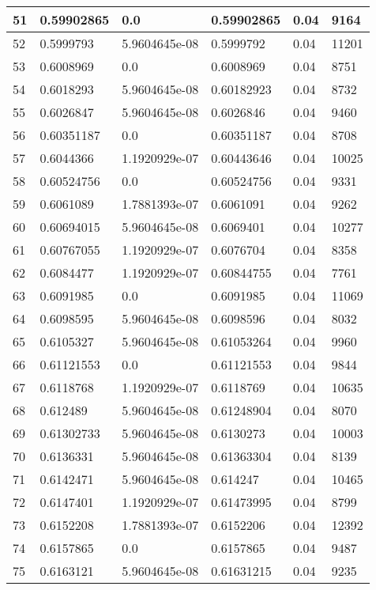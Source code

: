 \begin{longtable}{|l|l|l|l|l|l|}
51 & 0.59902865 & 0.0 & 0.59902865 & 0.04 & 9164 \\ \hline 
52 & 0.5999793 & 5.9604645e-08 & 0.5999792 & 0.04 & 11201 \\ \hline 
53 & 0.6008969 & 0.0 & 0.6008969 & 0.04 & 8751 \\ \hline 
54 & 0.6018293 & 5.9604645e-08 & 0.60182923 & 0.04 & 8732 \\ \hline 
55 & 0.6026847 & 5.9604645e-08 & 0.6026846 & 0.04 & 9460 \\ \hline 
56 & 0.60351187 & 0.0 & 0.60351187 & 0.04 & 8708 \\ \hline 
57 & 0.6044366 & 1.1920929e-07 & 0.60443646 & 0.04 & 10025 \\ \hline 
58 & 0.60524756 & 0.0 & 0.60524756 & 0.04 & 9331 \\ \hline 
59 & 0.6061089 & 1.7881393e-07 & 0.6061091 & 0.04 & 9262 \\ \hline 
60 & 0.60694015 & 5.9604645e-08 & 0.6069401 & 0.04 & 10277 \\ \hline 
61 & 0.60767055 & 1.1920929e-07 & 0.6076704 & 0.04 & 8358 \\ \hline 
62 & 0.6084477 & 1.1920929e-07 & 0.60844755 & 0.04 & 7761 \\ \hline 
63 & 0.6091985 & 0.0 & 0.6091985 & 0.04 & 11069 \\ \hline 
64 & 0.6098595 & 5.9604645e-08 & 0.6098596 & 0.04 & 8032 \\ \hline 
65 & 0.6105327 & 5.9604645e-08 & 0.61053264 & 0.04 & 9960 \\ \hline 
66 & 0.61121553 & 0.0 & 0.61121553 & 0.04 & 9844 \\ \hline 
67 & 0.6118768 & 1.1920929e-07 & 0.6118769 & 0.04 & 10635 \\ \hline 
68 & 0.612489 & 5.9604645e-08 & 0.61248904 & 0.04 & 8070 \\ \hline 
69 & 0.61302733 & 5.9604645e-08 & 0.6130273 & 0.04 & 10003 \\ \hline 
70 & 0.6136331 & 5.9604645e-08 & 0.61363304 & 0.04 & 8139 \\ \hline 
71 & 0.6142471 & 5.9604645e-08 & 0.614247 & 0.04 & 10465 \\ \hline 
72 & 0.6147401 & 1.1920929e-07 & 0.61473995 & 0.04 & 8799 \\ \hline 
73 & 0.6152208 & 1.7881393e-07 & 0.6152206 & 0.04 & 12392 \\ \hline 
74 & 0.6157865 & 0.0 & 0.6157865 & 0.04 & 9487 \\ \hline 
75 & 0.6163121 & 5.9604645e-08 & 0.61631215 & 0.04 & 9235 \\ \hline 
\end{longtable}